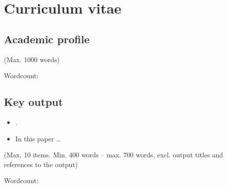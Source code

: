 \section{Curriculum vitae}\label{sec:cv}

\newrefcontext[labelprefix={ko},sorting=ydnt]

\subsection{Academic profile}\label{sec:profile}

\vspace{\baselineskip}
(Max. 1000 words)

\vspace{\baselineskip}
Wordcount:


\subsection{Key output}

\noprintbibliography

\begin{itemize}
    \setlength\itemsep{6pt}
    \item[\cite{clarke2018}] .
    \item[] In this paper \ldots
\end{itemize}

\vspace{\baselineskip}
(Max. 10 items. Min. 400 words -- max. 700 words, excl. output titles and references to the output)

\vspace{\baselineskip}
Wordcount:

